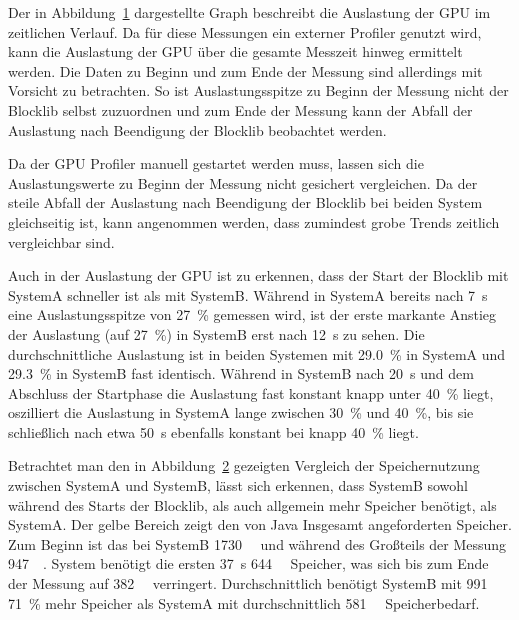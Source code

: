 \begin{figure}[!htbp]
	\caption{}\label{fig:seed-0-hexagon-gpu}
\end{figure}
Der in Abbildung~\ref{fig:seed-0-hexagon-gpu} dargestellte Graph beschreibt die Auslastung der GPU im zeitlichen Verlauf. Da für diese Messungen ein externer Profiler genutzt wird, kann die Auslastung der GPU über die gesamte Messzeit hinweg ermittelt werden. Die Daten zu Beginn und zum Ende der Messung sind allerdings mit Vorsicht zu betrachten. So ist Auslastungsspitze zu Beginn der Messung nicht der Blocklib selbst zuzuordnen und zum Ende der Messung kann der Abfall der Auslastung nach Beendigung der Blocklib beobachtet werden. 

Da der GPU Profiler manuell gestartet werden muss, lassen sich die Auslastungswerte zu Beginn der Messung nicht gesichert vergleichen. Da der steile Abfall der Auslastung nach Beendigung der Blocklib bei beiden System gleichseitig ist, kann angenommen werden, dass zumindest grobe Trends zeitlich vergleichbar sind.

Auch in der Auslastung der GPU ist zu erkennen, dass der Start der Blocklib mit SystemA schneller ist als mit SystemB. Während in SystemA bereits nach \SI{7}{\second} eine Auslastungsspitze von \SI{27}{\percent} gemessen wird, ist der erste markante Anstieg der Auslastung (auf \SI{27}{\percent}) in SystemB  erst nach \SI{12}{\second} zu sehen. Die durchschnittliche Auslastung ist in beiden Systemen mit \SI{29,0}{\percent} in SystemA und \SI{29,3}{\percent} in SystemB fast identisch. Während in SystemB nach \SI{20}{\second} und dem Abschluss der Startphase die Auslastung fast konstant knapp unter \SI{40}{\percent} liegt, oszilliert die Auslastung in SystemA lange zwischen \SI{30}{\percent} und \SI{40}{\percent}, bis sie schließlich nach etwa \SI{50}{\second} ebenfalls konstant bei knapp \SI{40}{\percent} liegt.

\begin{figure}[!htbp]
	\caption{}\label{fig:seed-0-hexagon-mem}
\end{figure} 
Betrachtet man den in Abbildung~\ref{fig:seed-0-hexagon-mem} gezeigten Vergleich der Speichernutzung zwischen SystemA und SystemB, lässt sich erkennen, dass SystemB sowohl während des Starts der Blocklib, als auch allgemein mehr Speicher benötigt, als SystemA. Der gelbe Bereich zeigt den von Java Insgesamt angeforderten Speicher. Zum Beginn ist das bei SystemB \SI{1730}{\mega\byte} und während des Großteils der Messung \SI{947}{\mega\byte}. System benötigt die ersten \SI{37}{\second} \SI{644}{\mega\byte} Speicher, was sich bis zum Ende der Messung auf \SI{382}{\mega\byte} verringert. Durchschnittlich benötigt SystemB mit \SI{991}{\mega\byte} \SI{71}{\percent} mehr Speicher als SystemA mit durchschnittlich \SI{581}{\mega\byte} Speicherbedarf.

